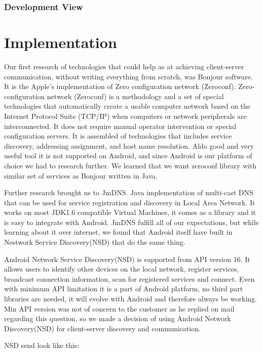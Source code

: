 \subsubsection{Development View}

\section{Implementation}

Our first research of technologies that could help as at achieving client-server communication, without writing everything from scratch, was Bonjour software. 
It is the Apple's implementation of Zero configuration network (Zeroconf). 
Zero-configuration network (Zeroconf)  is a methodology and a set of special technologies that automatically create a usable computer network based on the Internet Protocol Suite (TCP/IP) when computers or network peripherals are interconnected. 
It does not require manual operator intervention or special configuration servers.
It is assembled of technologies that includes service discovery, addressing assignment, and host name resolution.
Aldo good and very useful tool it is not supported on Android, and since Android is our platform of choice we had to research further. 
We learned that we want zeroconf library with similar set of services as Bonjour written in Java.


Further research brought us to JmDNS. Java implementation of multi-cast DNS that can be used for service registration and discovery in Local Area Network. 
It works on most JDK1.6 compatible Virtual Machines, it comes as a library and it is easy to integrate with Android. 
JmDNS fulfill all of our expectations, but while learning about it over internet, we found that Android itself have built in Nestwork Service Discovery(NSD) that do the same thing.


Android Network Service Discovery(NSD) is supported from API version 16. 
It allows users to identify other devices on the local network, register services, broadcast connection information, scan for registered services and connect.
Even with minimum API limitation it is a part of Android platform, no third part libraries are needed, it will evolve with Android and therefore always be working.
Min API version was not of concern to the customer as he replied on mail regarding this question, so we made a decision of using Android Network Discovery(NSD) for client-server discovery and communication.

NSD send look like this:

